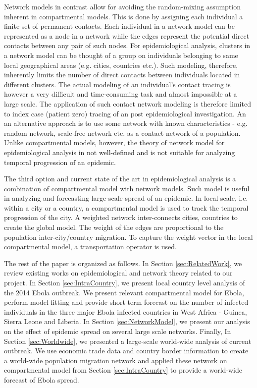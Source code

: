 \documentclass[10pt, journal,onecolumn]{IEEEtran}
\begin{document}
Network models in contrast allow for avoiding the random-mixing assumption inherent in compartmental models. This is done by assigning each individual a finite set of permanent contacts. Each individual in a network model can be represented as a node in a network while the edges represent the potential direct contacts between any pair of such nodes. For epidemiological analysis, clusters in a network model can be thought of a group on individuals belonging to same local geographical areas (e.g. cities, countries etc.). Such modeling, therefore, inherently limits the number of direct contacts between individuals located in different clusters. The actual modeling of an individual's contact tracing is however a very difficult and time-consuming task and almost impossible at a large scale. The application of such contact network modeling is therefore limited to index case (patient zero) tracing of an post epidemiological investigation. An an alternative approach is to use some network with known characteristics - e.g. random network, scale-free network etc. as a contact network of a population. Unlike compartmental models, however, the theory of network model for epidemiological analysis in not well-defined and is not suitable for analyzing temporal progression of an epidemic.

The third option and current state of the art in epidemiological analysis is a combination of compartmental model with network models. Such model is useful in analyzing and forecasting large-scale spread of an epidemic. In local scale, i.e. within a city or a country, a compartmental model is used to track the temporal progression of the city. A weighted network inter-connects cities, countries to create the global model. The weight of the edges are proportional to the population inter-city/country migration. To capture the weight vector in the local compartmental model, a transportation operator is used.

The rest of the paper is organized as follows. In Section \ref{sec:RelatedWork}, we review existing works on epidemiological and network theory related to our project. In Section \ref{sec:IntraCountry}, we present local country level analysis of the 2014 Ebola outbreak. We present relevant compartmental model for Ebola, perform model fitting and provide short-term forecast on the number of infected individuals in the three major Ebola infected countries in West Africa - Guinea, Sierra Leone and Liberia. In Section \ref{sec:NetworkModel}, we present our analysis on the effect of epidemic spread on several large scale networks. Finally, In Section \ref{sec:Worldwide}, we presented a large-scale world-wide analysis of current outbreak. We use economic trade data and country border information to create a world-wide population migration network and applied these network on compartmental model from Section \ref{sec:IntraCountry} to provide a world-wide forecast of Ebola spread.
\end{document}
